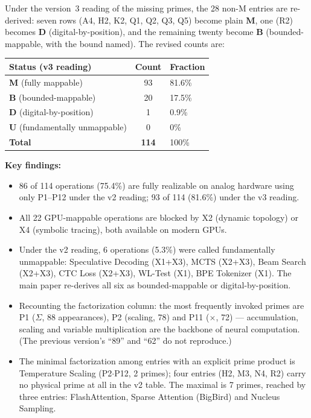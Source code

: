 \documentclass[10pt]{article}
\begin{document}
\bigskip
\noindent Under the version~3 reading of the missing primes, the 28 non-M entries
are re-derived: seven rows (A4, H2, K2, Q1, Q2, Q3, Q5) become plain \textbf{M},
one (R2) becomes \textbf{D} (digital-by-position), and the remaining twenty become
\textbf{B} (bounded-mappable, with the bound named). The revised counts are:

\begin{tabular}{lcl}
\toprule
Status (v3 reading) & Count & Fraction \\
\midrule
\textbf{M} (fully mappable) & 93 & 81.6\% \\
\textbf{B} (bounded-mappable) & 20 & 17.5\% \\
\textbf{D} (digital-by-position) & 1 & 0.9\% \\
\textbf{U} (fundamentally unmappable) & 0 & 0\% \\
\midrule
\textbf{Total} & \textbf{114} & 100\% \\
\bottomrule
\end{tabular}

\bigskip
\noindent\textbf{Key findings:}
\begin{itemize}[leftmargin=*]
\item 86 of 114 operations (75.4\%) are fully realizable on analog hardware using only P1--P12 under the v2 reading; 93 of 114 (81.6\%) under the v3 reading.
\item All 22 GPU-mappable operations are blocked by X2 (dynamic topology) or X4 (symbolic tracing), both available on modern GPUs.
\item Under the v2 reading, 6 operations (5.3\%) were called fundamentally unmappable: Speculative Decoding (X1+X3), MCTS (X2+X3), Beam Search (X2+X3), CTC Loss (X2+X3), WL-Test (X1), BPE Tokenizer (X1). The main paper re-derives all six as bounded-mappable or digital-by-position.
\item Recounting the factorization column: the most frequently invoked primes are P1 ($\Sigma$, 88 appearances), P2 (scaling, 78) and P11 ($\times$, 72) --- accumulation, scaling and variable multiplication are the backbone of neural computation. (The previous version's ``89'' and ``62'' do not reproduce.)
\item The minimal factorization among entries with an explicit prime product is Temperature Scaling (P2$\cdot$P12, 2 primes); four entries (H2, M3, N4, R2) carry no physical prime at all in the v2 table. The maximal is 7 primes, reached by three entries: FlashAttention, Sparse Attention (BigBird) and Nucleus Sampling.
\end{itemize}
\end{document}
